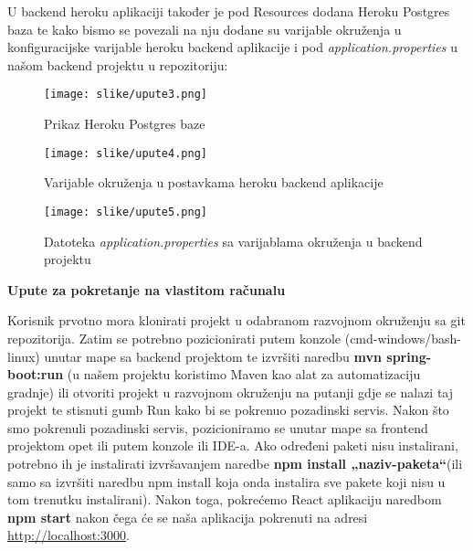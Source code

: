 U backend heroku aplikaciji također je pod Resources dodana Heroku Postgres baza te kako bismo se povezali na nju dodane su varijable okruženja u konfiguracijske varijable heroku backend aplikacije i pod \textit{application.properties} u našom backend projektu u repozitoriju:
	
				\begin{figure}[H]
					\texttt{[image: slike/upute3.png]}
					\centering
					\caption{Prikaz Heroku Postgres baze}
					\label{fig:upute3}
				\end{figure}
				
				\begin{figure}[H]
					\texttt{[image: slike/upute4.png]}
					\centering
					\caption{Varijable okruženja u postavkama heroku backend aplikacije}
					\label{fig:upute4}
				\end{figure}
				
				\begin{figure}[H]
					\texttt{[image: slike/upute5.png]}
					\centering
					\caption{Datoteka \textit{application.properties} sa varijablama okruženja u backend projektu}
					\label{fig:upute5}
				\end{figure}
			
			\noindent\textbf{Upute za pokretanje na vlastitom računalu}
			
Korisnik prvotno mora klonirati projekt u odabranom razvojnom okruženju sa git repozitorija. Zatim se potrebno pozicionirati putem konzole (cmd-windows/bash-linux) unutar mape sa backend projektom te izvršiti naredbu \textbf{mvn spring-boot:run} (u našem projektu koristimo Maven kao alat za automatizaciju gradnje) ili otvoriti projekt u razvojnom okruženju na putanji gdje se nalazi taj projekt te stisnuti gumb Run kako bi se pokrenuo pozadinski servis. Nakon što smo pokrenuli pozadinski servis, pozicioniramo se unutar mape sa frontend projektom opet ili putem konzole ili IDE-a. Ako određeni paketi nisu instalirani, potrebno ih je instalirati izvršavanjem naredbe \textbf{npm install „naziv-paketa“}(ili samo sa izvršiti naredbu npm install koja onda instalira sve pakete koji nisu u tom trenutku instalirani). Nakon toga, pokrećemo React aplikaciju naredbom \textbf{npm start} nakon čega će se naša aplikacija pokrenuti na adresi \underline{\url{http://localhost:3000}}.

			
			\eject 
